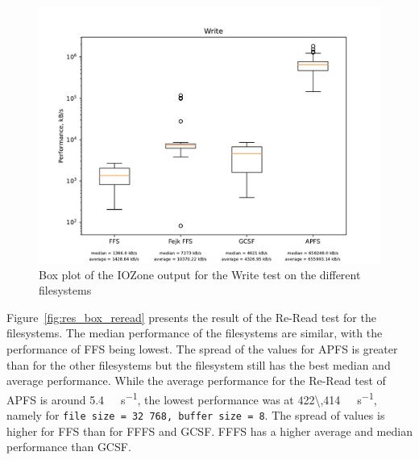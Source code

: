 \begin{figure}[!ht]
	\label{fig:res_box_write}
	\begin{center}
		\includegraphics[width=1.0\textwidth]{figures/benchmarking/Write_box.pdf}
	\end{center}
	\caption{Box plot of the IOZone output for the Write test on the different filesystems}
\end{figure}

\FloatBarrier

Figure~\ref{fig:res_box_reread} presents the result of the \mbox{Re-Read} test for the filesystems. The median performance of the filesystems are similar, with the performance of \gls{FFS} being lowest. The spread of the values for \gls{APFS} is greater than for the other filesystems but the filesystem still has the best median and average performance. While the average performance for the Re-Read test of \gls{APFS} is around \SI[per-mode = symbol]{5.4}{\giga\byte\per\second}, the lowest performance was at \SI[per-mode = symbol]{422\,414}{\kilo\byte\per\second}, namely for \texttt{file size = 32\,768, buffer size = 8}. The spread of values is higher for \gls{FFS} than for \gls{FFFS} and \gls{GCSF}. \gls{FFFS} has a higher average and median performance than \gls{GCSF}.

